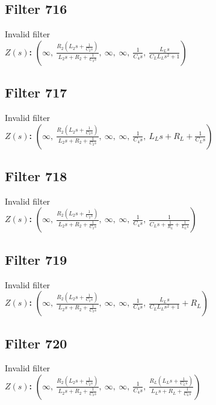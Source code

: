 \documentclass{article}
\begin{document}
\subsection*{Filter 716}
Invalid filter \\ 
\textbf{$Z(s)$:} $\left( \infty, \  \frac{R_{2} \left(L_{2} s + \frac{1}{C_{2} s}\right)}{L_{2} s + R_{2} + \frac{1}{C_{2} s}}, \  \infty, \  \infty, \  \frac{1}{C_{4} s}, \  \frac{L_{L} s}{C_{L} L_{L} s^{2} + 1}\right)$ \\ 
\subsection*{Filter 717}
Invalid filter \\ 
\textbf{$Z(s)$:} $\left( \infty, \  \frac{R_{2} \left(L_{2} s + \frac{1}{C_{2} s}\right)}{L_{2} s + R_{2} + \frac{1}{C_{2} s}}, \  \infty, \  \infty, \  \frac{1}{C_{4} s}, \  L_{L} s + R_{L} + \frac{1}{C_{L} s}\right)$ \\ 
\subsection*{Filter 718}
Invalid filter \\ 
\textbf{$Z(s)$:} $\left( \infty, \  \frac{R_{2} \left(L_{2} s + \frac{1}{C_{2} s}\right)}{L_{2} s + R_{2} + \frac{1}{C_{2} s}}, \  \infty, \  \infty, \  \frac{1}{C_{4} s}, \  \frac{1}{C_{L} s + \frac{1}{R_{L}} + \frac{1}{L_{L} s}}\right)$ \\ 
\subsection*{Filter 719}
Invalid filter \\ 
\textbf{$Z(s)$:} $\left( \infty, \  \frac{R_{2} \left(L_{2} s + \frac{1}{C_{2} s}\right)}{L_{2} s + R_{2} + \frac{1}{C_{2} s}}, \  \infty, \  \infty, \  \frac{1}{C_{4} s}, \  \frac{L_{L} s}{C_{L} L_{L} s^{2} + 1} + R_{L}\right)$ \\ 
\subsection*{Filter 720}
Invalid filter \\ 
\textbf{$Z(s)$:} $\left( \infty, \  \frac{R_{2} \left(L_{2} s + \frac{1}{C_{2} s}\right)}{L_{2} s + R_{2} + \frac{1}{C_{2} s}}, \  \infty, \  \infty, \  \frac{1}{C_{4} s}, \  \frac{R_{L} \left(L_{L} s + \frac{1}{C_{L} s}\right)}{L_{L} s + R_{L} + \frac{1}{C_{L} s}}\right)$ \\ 
\end{document}
